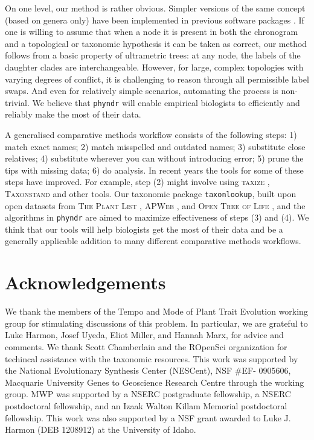 \documentclass[a4paper,11pt]{article}
\newcommand{\phyndr}{\tt phyndr}
\newcommand{\taxonlookup}{\tt taxonlookup}
\begin{document}
On one level, our method is rather obvious. Simpler versions of the same concept (based on genera only) have been implemented in previous software packages \citep[e.g.,][]{pearse2013phylogenerator}.  If one is willing to assume that when a node it is present in both the chronogram and a topological or taxonomic hypothesis it can be taken as correct, our method follows from a basic property of ultrametric trees: at any node, the labels of the daughter clades are interchangeable. However, for large, complex topologies with varying degrees of conflict, it is challenging to reason through all permissible label swaps. And even for relatively simple scenarios, automating the process is non-trivial. We believe that {\phyndr} will enable empirical biologists to efficiently and reliably make the most of their data.

A generalised comparative methods workflow consists of the following steps:  1) match exact names; 2) match misspelled and outdated names; 3) substitute close relatives; 4) substitute wherever you can without introducing error; 5) prune the tips with missing data; 6) do analysis.  In recent years the tools for some of these steps have improved.  For example, step (2) might involve using \textsc{taxize} \citep{taxize}, \textsc{Taxonstand} \citep{cayuela2012} and other tools.
%
%
Our taxonomic package {\taxonlookup}, built upon open datasets from \textsc{The Plant List} \citep{ThePlantList}, \textsc{APWeb} \citep{apweb}, and \textsc{Open Tree of Life} \citep{OpenTree}, and the algorithms in {\phyndr} are aimed to maximize effectiveness of steps (3) and (4). We think that our tools will help biologists get the most of their data and be a generally applicable addition to many different comparative methods workflows.

\section{Acknowledgements}
We thank the members of the Tempo and Mode of Plant Trait
Evolution working group for stimulating discussions of this problem. In particular, we are grateful to Luke Harmon, Josef Uyeda, Eliot Miller, and Hannah Marx, for advice and comments. We thank Scott Chamberlain and the ROpenSci organization for techincal assistance with the taxonomic resources. This work was supported by the National Evolutionary Synthesis Center
(NESCent), NSF \#EF- 0905606, Macquarie University Genes to Geoscience
Research Centre through the working group. MWP was supported by a NSERC postgraduate fellowship, a NSERC postdoctoral fellowship, and an Izaak Walton Killam Memorial postdoctoral fellowship. This work was also supported by a NSF grant awarded to Luke J. Harmon (DEB 1208912) at the University of Idaho. 
\end{document}
